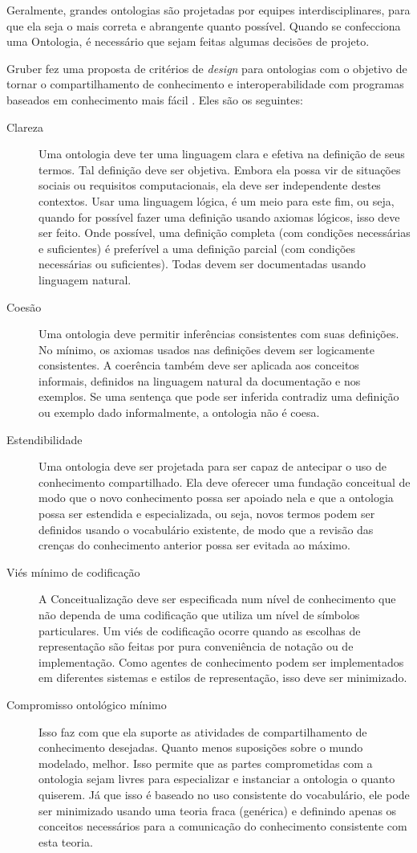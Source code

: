 Geralmente, grandes ontologias são projetadas por equipes interdisciplinares, para que ela seja o mais correta e abrangente quanto possível. Quando se confecciona uma Ontologia, é necessário que sejam feitas algumas decisões de projeto.  

Gruber fez uma proposta de critérios de \textit{design} para ontologias com o objetivo de tornar o compartilhamento de conhecimento e interoperabilidade com programas baseados em conhecimento mais fácil \citep{ontoGruber}. Eles são os seguintes:

\begin{description}
	\item[Clareza] Uma ontologia deve ter uma linguagem clara e efetiva na definição de seus termos. Tal definição deve ser objetiva. Embora ela possa vir de situações sociais ou requisitos computacionais, ela deve ser independente destes contextos. Usar uma linguagem lógica, é um meio para este fim, ou seja, quando for possível fazer uma definição usando axiomas lógicos, isso deve ser feito. Onde possível, uma definição completa (com condições necessárias e suficientes) é preferível a uma definição parcial (com condições necessárias ou suficientes). Todas devem ser documentadas usando linguagem natural.
	\item[Coesão] Uma ontologia deve permitir inferências consistentes com suas definições. No mínimo, os axiomas usados nas definições devem ser logicamente consistentes. A coerência também deve ser aplicada aos conceitos informais, definidos na linguagem natural da documentação e nos exemplos. Se uma sentença que pode ser inferida contradiz uma definição ou exemplo dado informalmente, a ontologia não é coesa.
	\item[Estendibilidade] Uma ontologia deve ser projetada para ser capaz de antecipar o uso de conhecimento compartilhado. Ela deve oferecer uma fundação conceitual de modo que o novo conhecimento possa ser apoiado nela e que a ontologia possa ser estendida e especializada, ou seja, novos termos podem ser definidos usando o vocabulário existente, de modo que a revisão das crenças do conhecimento anterior possa ser evitada ao máximo.
	\item[Viés mínimo de codificação] A Conceitualização deve ser especificada num nível de conhecimento que não dependa de uma codificação que utiliza um nível de símbolos particulares. Um viés de codificação ocorre quando as escolhas de representação são feitas por pura conveniência de notação ou de implementação. Como agentes de conhecimento podem ser implementados em diferentes sistemas e estilos de representação, isso deve ser minimizado.
	\item[Compromisso ontológico mínimo] Isso faz com que ela suporte as atividades de compartilhamento de conhecimento desejadas. Quanto menos suposições sobre o mundo modelado, melhor. Isso permite que as partes comprometidas com a ontologia sejam livres para especializar e instanciar a ontologia o quanto quiserem. Já que isso é baseado no uso consistente do vocabulário, ele pode ser minimizado usando uma teoria fraca (genérica) e definindo apenas os conceitos necessários para a comunicação do conhecimento consistente com esta teoria.
\end{description}

